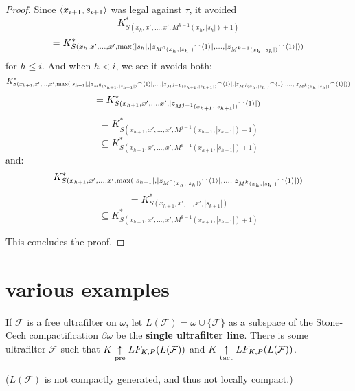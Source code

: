 \begin{proof}
Since $\langle x_{i+1},s_{i+1}\rangle$ was legal against $\tau$, it avoided
  \[
    K^*_{S(x_h,x',\dots,x',M^{k-1}(x_h,|s_h|)+1)} 
  \]
  \[
    = 
    K^*_{S(x_h,x',\dots,x',\max(|s_h|,|{z_{M^{0}(x_h,|s_h|)}}^\frown\langle1\rangle|,\dots,|{z_{M^{k-1}(x_h,|s_h|)}}^\frown\langle1\rangle|))}
  \]
for $h\leq i$. And when $h<i$, we see it avoids both:
  \[
    K^*_{S(x_{h+1},x',\dots,x',\max(|s_{h+1}|,|{z_{M^0(x_{h+1},|s_{h+1}|)}}^\frown\langle1\rangle|,\dots,|{z_{M^{j-1}(x_{h+1},|s_{h+1}|)}}^\frown\langle1\rangle|,|{z_{M^{j}(x_{h},|s_{h}|)}}^\frown\langle1\rangle|,\dots,|{z_{M^{k}(x_{h},|s_{h}|)}}^\frown\langle1\rangle|))} 
  \]
  \[
    =
    K^*_{S(x_{h+1},x',\dots,x',|{z_{M^{j-1}(x_{h+1},|s_{h+1}|)}}^\frown\langle1\rangle|)}
  \]
  \[
    =
    K^*_{S(x_{h+1},x',\dots,x',M^{j-1}(x_{h+1},|s_{h+1}|)+1)}
  \]
  \[
    \subseteq
    K^*_{S(x_{h+1},x',\dots,x',M^{k-1}(x_{h+1},|s_{h+1}|)+1)}
  \]
and:
  \[
    K^*_{S(x_{h+1},x',\dots,x',\max(|s_{h+1}|,|{z_{M^0(x_{h},|s_{h}|)}}^\frown\langle1\rangle|,\dots,|{z_{M^{k}(x_{h},|s_{h}|)}}^\frown\langle1\rangle|))} 
  \]
  \[
    =
    K^*_{S(x_{h+1},x',\dots,x',|s_{k+1}|)}
  \]
  \[
    \subseteq
    K^*_{S(x_{h+1},x',\dots,x',M^{k-1}(x_{h+1},|s_{h+1}|)+1)}
  \]


This concludes the proof.
\end{proof}




\section{various examples}

\begin{ex}
If $\mathcal{F}$ is a free ultrafilter on $\omega$, let $L(\mathcal{F})=\omega \cup \{\mathcal{F}\}$ as a subspace of the Stone-Cech compactification $\beta\omega$ be the \textbf{single ultrafilter line}. There is some ultrafilter $\mathcal{F}$ such that $K \underset{\text{pre}}{\uparrow} LF_{K,P}(L(\mathcal{F}))$ and $K \underset{\text{tact}}{\uparrow} LF_{K,P}(L(\mathcal{F}))$.

($L(\mathcal{F})$ is not compactly generated, and thus not locally compact.)
\end{ex}

